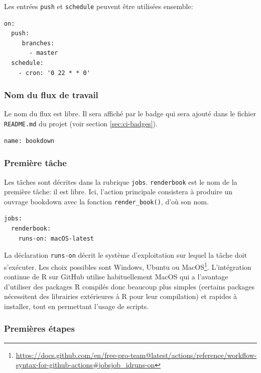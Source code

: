 \documentclass[
  12pt,
  french,
  a4paper,
  extrafontsizes,onecolumn,openright
  ]{memoir}
\begin{document}
Les entrées \texttt{push} et \texttt{schedule} peuvent être utilisées ensemble:

\begin{verbatim}
on:
  push:
     branches:
       - master
  schedule:
    - cron: '0 22 * * 0'
\end{verbatim}

\hypertarget{nom-du-flux-de-travail}{%
\subsubsection{Nom du flux de travail}\label{nom-du-flux-de-travail}}

Le nom du flux est libre.
Il sera affiché par le badge qui sera ajouté dans le fichier \texttt{README.md} du projet (voir section \ref{sec:ci-badges}).

\begin{verbatim}
name: bookdown
\end{verbatim}

\hypertarget{premiuxe8re-tuxe2che}{%
\subsubsection{Première tâche}\label{premiuxe8re-tuxe2che}}

Les tâches sont décrites dans la rubrique \texttt{jobs}.
\texttt{renderbook} est le nom de la première tâche: il est libre.
Ici, l'action principale consistera à produire un ouvrage bookdown avec la fonction \texttt{render\_book()}, d'où son nom.

\begin{verbatim}
jobs:
  renderbook:
    runs-on: macOS-latest
\end{verbatim}

La déclaration \texttt{runs-on} décrit le système d'exploitation sur lequel la tâche doit s'exécuter.
Les choix possibles sont Windows, Ubuntu ou MacOS\footnote{\url{https://docs.github.com/en/free-pro-team@latest/actions/reference/workflow-syntax-for-github-actions\#jobsjob_idruns-on}}.
L'intégration continue de R sur GitHub utilise habituellement MacOS qui a l'avantage d'utiliser des packages R compilés donc beaucoup plus simples (certains packages nécessitent des librairies extérieures à R pour leur compilation) et rapides à installer, tout en permettant l'usage de scripts.

\hypertarget{premiuxe8res-uxe9tapes}{%
\subsubsection{Premières étapes}\label{premiuxe8res-uxe9tapes}}
\end{document}
